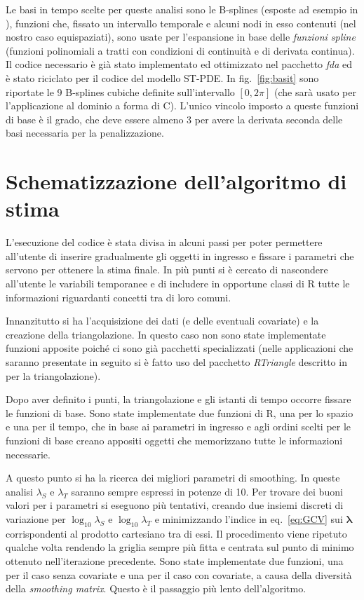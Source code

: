 \documentclass[a4paper,11pt,twoside,openright]{book}							%
\begin{document}
Le basi in tempo scelte per queste analisi sono le B-splines (esposte ad esempio in \cite{art:ramsaysilverman}), funzioni che, fissato un intervallo temporale e alcuni nodi in esso contenuti (nel nostro caso equispaziati), sono usate per l'espansione in base delle \textit{funzioni spline} (funzioni polinomiali a tratti con condizioni di continuità e di derivata continua). Il codice necessario è già stato implementato ed ottimizzato nel pacchetto \textit{fda} ed è stato riciclato per il codice del modello ST-PDE. In fig.~\ref{fig:basit} sono riportate le 9 B-splines cubiche definite sull'intervallo $[0,2\pi]$ (che sarà usato per l'applicazione al dominio a forma di C). L'unico vincolo imposto a queste funzioni di base è il grado, che deve essere almeno 3 per avere la derivata seconda delle basi necessaria per la penalizzazione.

\section{Schematizzazione dell'algoritmo di stima}
\label{sec:alg}
L'esecuzione del codice è stata divisa in alcuni passi per poter permettere all'utente di inserire gradualmente gli oggetti in ingresso e fissare i parametri che servono per ottenere la stima finale. In più punti si è cercato di nascondere all'utente le variabili temporanee e di includere in opportune classi di R tutte le informazioni riguardanti concetti tra di loro comuni. 

Innanzitutto si ha l'acquisizione dei dati (e delle eventuali covariate) e la creazione della triangolazione. In questo caso non sono state implementate funzioni apposite poiché ci sono già pacchetti specializzati (nelle applicazioni che saranno presentate in seguito si è fatto uso del pacchetto \textit{RTriangle} descritto in \cite{package:RTriangle} per la triangolazione).

Dopo aver definito i punti, la triangolazione e gli istanti di tempo occorre fissare le funzioni di base. Sono state implementate due funzioni di R, una per lo spazio e una per il tempo, che in base ai parametri in ingresso e agli ordini scelti per le funzioni di base creano appositi oggetti che memorizzano tutte le informazioni necessarie.  

A questo punto si ha la ricerca dei migliori parametri di smoothing. In queste analisi $\lambda_S$ e $\lambda_T$ saranno sempre espressi in potenze di 10. Per trovare dei buoni valori per i parametri si eseguono più tentativi, creando due insiemi discreti di variazione per $\log_{10}\lambda_S$ e $\log_{10}\lambda_T$ e minimizzando l'indice in eq.~\eqref{eq:GCV} sui $\bm \lambda$ corrispondenti al prodotto cartesiano tra di essi. Il procedimento viene ripetuto qualche volta rendendo la griglia sempre più fitta e centrata sul punto di minimo ottenuto nell'iterazione precedente. Sono state implementate due funzioni, una per il caso senza covariate e una per il caso con covariate, a causa della diversità della \textit{smoothing matrix}. Questo è il passaggio più lento dell'algoritmo.
\end{document}
